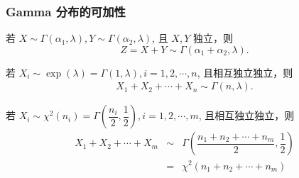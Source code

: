  \begin{frame}
 	\frametitle{Gamma 分布的可加性}
 	\begin{exam}
 		若 $X\sim \Gamma (\alpha_1,\lambda), Y\sim \Gamma (\alpha_2,\lambda)$, 且 $X,Y$ 独立，则 $$Z=X+Y\sim \Gamma (\alpha_1+\alpha_2,\lambda).$$
 	\end{exam}

 	\pause \begin{exam}
 		若 $X_i\sim \exp (\lambda)=\Gamma (1,\lambda), i=1,2,\cdots,n$, 且相互独立独立，则
 		\begin{eqnarray*}
 			X_1+X_2+\cdots+X_n\sim \Gamma(n,\lambda).
 		\end{eqnarray*}
 	\end{exam}

 	\pause
 	\begin{exam}
 		若 $X_i\sim \chi^2 (n_i)=\Gamma (\dfrac{n_i}{2},\dfrac{1}{2}), i=1,2,\cdots,m$, 且相互独立独立，则
 		\begin{eqnarray*}
 			X_1+X_2+\cdots+X_m&\sim& \Gamma(\dfrac{n_1+n_2+\cdots+n_m}{2},\dfrac{1}{2})\\
 			&=& \chi^2(n_1+n_2+\cdots+n_m)  \end{eqnarray*}

 	\end{exam}



 \end{frame}

